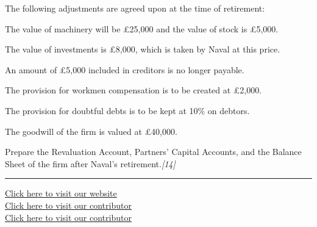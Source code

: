 \documentclass[11pt,a4paper]{article}
\newcommand{\pts}[1]{\hfill   \textit{[#1]}}
\begin{document}
\noindent The following adjustments are agreed upon at the time of retirement:

\begin{parts}
  \item The value of machinery will be \pounds 25,000 and the value of stock is \pounds 5,000.
  \item The value of investments is \pounds 8,000, which is taken by Naval at this price.
  \item An amount of \pounds 5,000 included in creditors is no longer payable.
  \item The provision for workmen compensation is to be created at \pounds 2,000.
  \item The provision for doubtful debts is to be kept at 10\% on debtors.
  \item The goodwill of the firm is valued at \pounds 40,000.
\end{parts}
Prepare the Revaluation Account, Partners' Capital Accounts, and the Balance Sheet of the firm after Naval's retirement.\pts{14}

\vfill
\rule{\linewidth}{0.4pt}

\begin{center}\small
\href{https://bhu-exam.vercel.app/}{Click here to visit our website}\\[4pt]
\href{https://me-aryan.vercel.app/}{Click here to visit our contributor}\\[4pt]
\href{https://quashan-me.vercel.app/}{Click here to visit our contributor}
\end{center}
\end{document}
